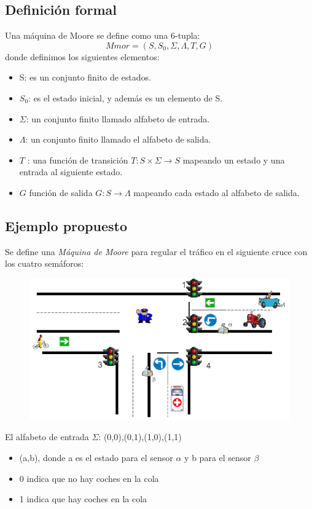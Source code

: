 \documentclass[12pt,a4paper]{article}
\begin{document}
	
	\subsection{Definición formal}
	Una máquina de Moore se define como una 6-tupla:
	\[ Mmor = (S,S_{0},\Sigma,\Lambda,T,G)  \]
	donde definimos los siguientes elementos:
	\begin{itemize}
		\item S: es un conjunto finito de estados.
		\item $S_{0}$: es el estado inicial, y además es un elemento de S.
		\item $\Sigma$: un conjunto finito llamado alfabeto de entrada.
		\item $\Lambda$: un conjunto finito llamado el alfabeto de salida.
		\item $T$ : una función de transición $T: S \times \Sigma \rightarrow S$ mapeando un estado y una entrada al siguiente estado.
		\item $G$ función de salida $G : S \rightarrow \Lambda $ mapeando cada estado al alfabeto de salida.
	\end{itemize}
	\clearpage

	
	\newpage
	\subsection{Ejemplo propuesto}
	Se define una \textit{Máquina de Moore} para regular el tráfico en el siguiente cruce con los cuatro semáforos:
		
	\begin{figure}[h]
		\centering
		\includegraphics[width=0.4
		\linewidth]{img/4}
		\caption{}
		\label{fig:4}
	\end{figure}

El alfabeto de entrada $\Sigma$: {(0,0),(0,1),(1,0),(1,1)}

	\begin{itemize}
		\item (a,b), donde a es el estado para el sensor $\alpha$ y b para el sensor $\beta$
		\item 0 indica que no hay coches en la cola
		\item 1 indica que hay coches en la cola
	\end{itemize}
\end{document}
